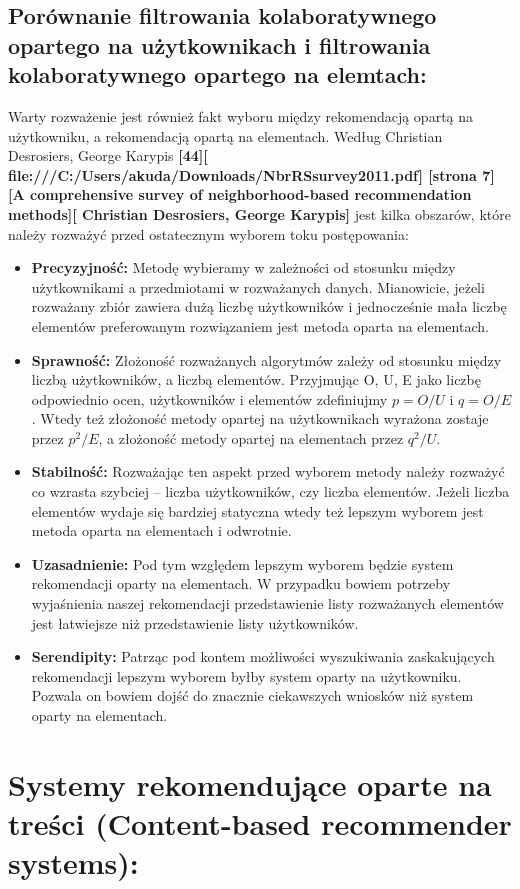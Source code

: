 \documentclass[12pt,a4paper]{report}
\begin{document}
\subsection{Porównanie filtrowania kolaboratywnego opartego na użytkownikach i filtrowania kolaboratywnego opartego na elemtach:}
Warty rozważenie jest również fakt wyboru między rekomendacją opartą na użytkowniku, a rekomendacją opartą na elementach. Według Christian Desrosiers, George Karypis \textbf{[44][ file:///C:/Users/akuda/Downloads/NbrRSsurvey2011.pdf] [strona 7] [A comprehensive survey of neighborhood-based recommendation methods][ Christian Desrosiers, George Karypis]} jest kilka obszarów, które należy rozważyć przed ostatecznym wyborem toku postępowania:
\begin{itemize}
\item \textbf{Precyzyjność:} Metodę wybieramy w zależności od stosunku między użytkownikami a przedmiotami w rozważanych danych. Mianowicie, jeżeli rozważany zbiór zawiera dużą liczbę użytkowników i jednocześnie mała liczbę elementów preferowanym rozwiązaniem jest metoda oparta na elementach.
\item \textbf{Sprawność:} Złożoność rozważanych algorytmów zależy od stosunku między liczbą użytkowników, a liczbą elementów. Przyjmując O, U, E jako liczbę odpowiednio ocen, użytkowników i elementów zdefiniujmy 
$p = O/U$ i $q = O/E$. Wtedy też złożoność metody opartej na użytkownikach wyrażona zostaje przez $p^2/E$, a złożoność metody opartej na elementach przez $q^2/U$.
\item \textbf{Stabilność:} Rozważając ten aspekt przed wyborem metody należy rozważyć co wzrasta szybciej – liczba użytkowników, czy liczba elementów. Jeżeli liczba elementów wydaje się bardziej statyczna wtedy też lepszym wyborem jest metoda oparta na elementach i odwrotnie.
\item \textbf{Uzasadnienie:} Pod tym względem lepszym wyborem będzie system rekomendacji oparty na elementach. W przypadku bowiem potrzeby wyjaśnienia naszej rekomendacji przedstawienie listy rozważanych elementów jest łatwiejsze niż przedstawienie listy użytkowników.
\item \textbf{Serendipity:} Patrząc pod kontem możliwości wyszukiwania zaskakujących rekomendacji lepszym wyborem byłby system oparty na użytkowniku. Pozwala on bowiem dojść do znacznie ciekawszych wniosków niż system oparty na elementach.
\end{itemize}


\section{Systemy rekomendujące oparte na treści (Content-based recommender systems):}
\end{document}
